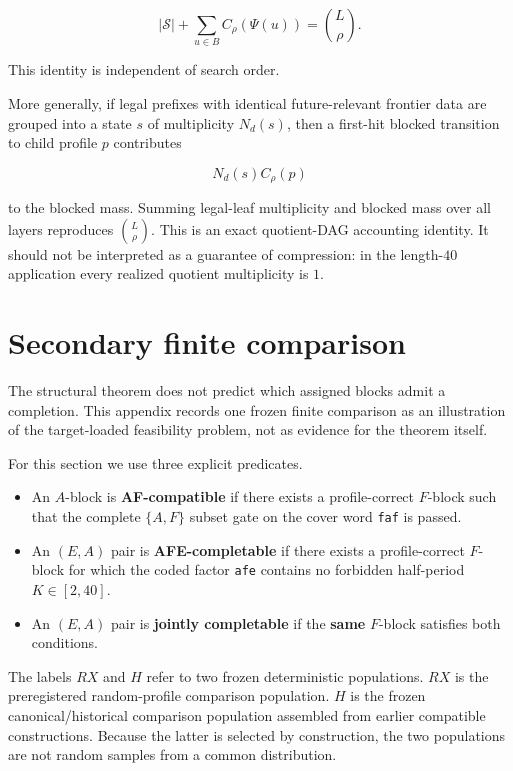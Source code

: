\documentclass[
  british,
  a4paper,
  11pt]{article}
\providecommand{\tightlist}{%
  \setlength{\itemsep}{0pt}\setlength{\parskip}{0pt}}
\begin{document}
\[
|\mathcal S|
+
\sum_{u\in B}C_\rho(\Psi(u))
=
\binom{L}{\rho}.
\tag{B.1}
\]

This identity is independent of search order.

More generally, if legal prefixes with identical future-relevant
frontier data are grouped into a state \(s\) of multiplicity \(N_d(s)\),
then a first-hit blocked transition to child profile \(p\) contributes

\[
N_d(s)C_\rho(p)
\]

to the blocked mass. Summing legal-leaf multiplicity and blocked mass
over all layers reproduces \(\binom{L}{\rho}\). This is an exact
quotient-DAG accounting identity. It should not be interpreted as a
guarantee of compression: in the length-\(40\) application every
realized quotient multiplicity is \(1\).

\section{Secondary finite comparison}\label{secondary-finite-comparison}

The structural theorem does not predict which assigned blocks admit a
completion. This appendix records one frozen finite comparison as an
illustration of the target-loaded feasibility problem, not as evidence
for the theorem itself.

For this section we use three explicit predicates.

\begin{itemize}
\tightlist
\item
  An \(A\)-block is \textbf{AF-compatible} if there exists a
  profile-correct \(F\)-block such that the complete \(\{A,F\}\) subset
  gate on the cover word \texttt{faf} is passed.
\item
  An \((E,A)\) pair is \textbf{AFE-completable} if there exists a
  profile-correct \(F\)-block for which the coded factor \texttt{afe}
  contains no forbidden half-period \(K\in[2,40]\).
\item
  An \((E,A)\) pair is \textbf{jointly completable} if the \textbf{same}
  \(F\)-block satisfies both conditions.
\end{itemize}

The labels \(RX\) and \(H\) refer to two frozen deterministic
populations. \(RX\) is the preregistered random-profile comparison
population. \(H\) is the frozen canonical/historical comparison
population assembled from earlier compatible constructions. Because the
latter is selected by construction, the two populations are not random
samples from a common distribution.
\end{document}
